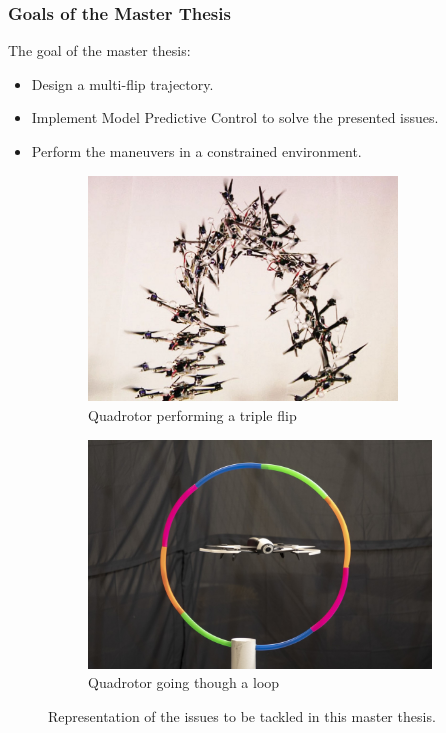 \documentclass{thesisbeamer}
\newcommand\Fontvi{\fontsize{9}{10}\selectfont}
\begin{document}
\begin{frame}
\frametitle{Goals of the Master Thesis}
\Fontvi

The goal of the master thesis: 

\begin{itemize} %
	\item Design a multi-flip trajectory.
	\item Implement Model Predictive Control to solve the presented issues.
	\item Perform the maneuvers in a constrained environment.
\end{itemize}

\begin{figure}[h]
     \centering
     \begin{subfigure}[h]{0.4\textwidth}
         \centering
         \includegraphics[width=0.9\textwidth]{Images/Introduction/flip}
    \caption{Quadrotor performing a triple flip\protect\footnotemark}
         \label{triple_flip}
     \end{subfigure}
     \hfill
     \begin{subfigure}[h]{0.38\textwidth}
         \centering
         \includegraphics[width=\textwidth]{Images/Introduction/constrained_environment}
         \caption[Caption for LOF]{Quadrotor going though a loop\protect\footnotemark}
         \label{drone_hulahoop}
     \end{subfigure}
        \caption{\tiny{Representation of the issues to be tackled in this master thesis.}}
        \label{fig:three graphs}
\end{figure}


\end{frame}
\end{document}
